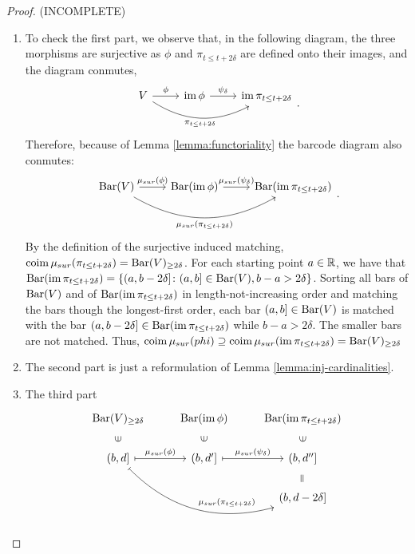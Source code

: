 \begin{proof} (INCOMPLETE)
\begin{enumerate}
    \item
    To check the first part, we observe that, in the following diagram, the three morphisms are surjective as $\phi$ and $\pi_{t \leq t+2\delta}$ are defined onto their images, and the diagram conmutes,
    $$
    \begin{tikzcd}
        V \arrow[r, "\phi"] \arrow[rr, "\pi_{t \leq t+2\delta}"', bend right] 
        & \im \phi \arrow[r, "\psi_\delta"] 
        & \im \pi_{t \leq t+2\delta} \\
    \end{tikzcd}.
    $$
    Therefore, because of Lemma \ref{lemma:functoriality} the barcode diagram also conmutes:
    $$
    \begin{tikzcd}
        \barc(V) \arrow[r, "\mu_{sur}(\phi)"] \arrow[rr, "\mu_{sur}(\pi_{t \leq t+2\delta})"', bend right] 
        & \barc(\im \phi) \arrow[r, "\mu_{sur}({\psi_\delta})"] 
        & \barc(\im \pi_{t \leq t+2\delta}) \\
    \end{tikzcd}.
    $$
    By the definition of the surjective induced matching, $ \operatorname{coim} \mu_{sur}(\pi_{t \leq t+2\delta}) = \operatorname{Bar}(V)_{\geq 2\delta}$. For each starting point $ a \in \mathbb R $, we have that $\operatorname{Bar}(\operatorname{im} \pi_{t \leq t+2\delta}) = \{ (a, b-2\delta] \colon (a, b]\in \operatorname{Bar}(V), b-a > 2\delta\}$. Sorting all bars of $\operatorname{Bar}(V) $ and of $\operatorname{Bar}(\operatorname{im} \pi_{t \leq t+2\delta}) $ in length-not-increasing order and matching the bars though the longest-first order, each bar $ (a, b] \in \operatorname{Bar}(V) $ is matched with the bar $ (a, b - 2\delta] \in \operatorname{Bar}(\operatorname{im} \pi_{t \leq t+2\delta}) $ while $ b -a >2 \delta $. The smaller bars are not matched. Thus, $\operatorname{coim} \mu_{sur}(phi) \supseteq \operatorname{coim} \mu_{sur}(\operatorname{im} \pi_{t \leq t+2\delta}) = \operatorname{Bar} (V)_{\geq 2\delta} $

    \item
    The second part is just a reformulation of Lemma \ref{lemma:inj-cardinalities}.

    \item
    The third part
    $$
    \begin{tikzcd}
    \barc(V)_{\geq 2 \delta}
    & \barc(\im \phi)
    & \barc(\im \pi_{t \leq t+2\delta}) \\
    (b, d] \arrow[r, mapsto, "\mu_{sur}(\phi)"] \arrow[u, phantom, "{\rotatebox{90}{$\in$}}"] \arrow[rrd, mapsto, bend right, "\mu_{sur}(\pi_{t \leq t+2\delta})" ]
    & (b, d'] \arrow[r, mapsto, "\mu_{sur}(\psi_\delta)"] \arrow[u, phantom, "{\rotatebox{90}{$\in$}}"]
    & (b, d''] \arrow[u, phantom, "{\rotatebox{90}{$\in$}}"] \\
    &
    & (b, d - 2 \delta] \arrow[u, phantom, "{\rotatebox{90}{$=$}}"]
    \end{tikzcd}
    $$
\end{enumerate}
\end{proof}

